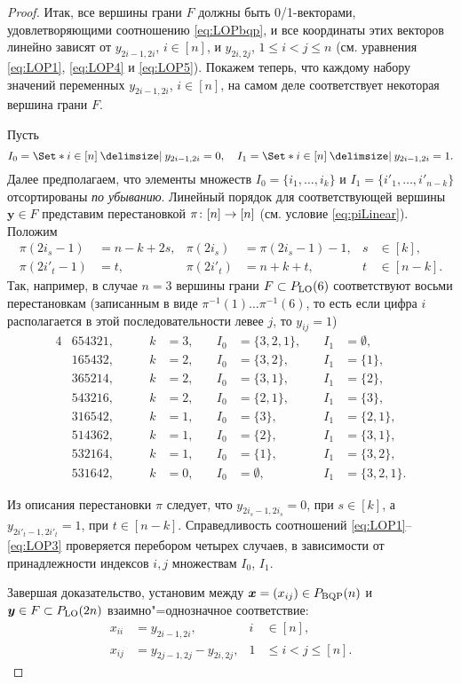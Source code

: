 \begin{proof}
Итак, все вершины грани $F$ должны быть 0/1-векторами, удовлетворяющими соотношению \eqref{eq:LOPbqp}, и все координаты этих векторов линейно зависят от $y_{2i-1, 2i}$, $i\in[n]$, и $y_{2i, 2j}$, $1 \le i < j \le n$ (см. уравнения \eqref{eq:LOP1}, \eqref{eq:LOP4} и \eqref{eq:LOP5}).
Покажем теперь, что каждому набору значений переменных $y_{2i-1, 2i}$, $i\in[n]$,
на самом деле соответствует некоторая вершина грани $F$.

Пусть 
\[
I_0 = \Set*{i \in [n] \given y_{2i-1, 2i} = 0}, \quad I_1 = \Set*{i \in [n] \given y_{2i-1, 2i} = 1}.
\]
Далее предполагаем, что элементы множеств $I_0 = \{i_1, \dots, i_k\}$ и $I_1 = \{i'_1, \dots, i'_{n-k}\}$ отсортированы \emph{по убыванию}.
Линейный порядок для соответствующей вершины $\bm{y} \in F$ представим перестановкой $\pi \colon [n] \to [n]$ (см. условие \eqref{eq:piLinear}).
Положим
\begin{align*}
\pi(2i_s-1) &= n-k + 2 s, &
\pi(2i_s) &= \pi(2i_s-1)-1, & s &\in [k],\\
\pi(2i'_t-1) &= t, &
\pi(2i'_t) &= n + k + t, & t &\in [n-k].
\end{align*}
Так, например, в случае $n=3$ вершины грани $F \subset P_{\textup{LO}}(6)$ соответствуют восьми перестановкам (записанным в виде $\pi^{-1}(1)\ldots\pi^{-1}(6)$, то есть если цифра $i$ располагается в этой последовательности левее $j$, то $y_{ij} = 1$)
\begin{alignat*}{4}
&654321, \qquad & k &=3 , \quad & I_0 &= \{3,2,1\}, \quad& I_1 &= \emptyset,\\
&165432, & k &=2 , \quad & I_0 &= \{3,2\},   & I_1 &= \{1\},\\
&365214, & k &=2 , \quad & I_0 &= \{3,1\},   & I_1 &= \{2\},\\
&543216, & k &=2 , \quad & I_0 &= \{2,1\},   & I_1 &= \{3\},\\
&316542, & k &=1 , \quad & I_0 &= \{3\},     & I_1 &= \{2,1\},\\
&514362, & k &=1 , \quad & I_0 &= \{2\},     & I_1 &= \{3,1\},\\
&532164, & k &=1 , \quad & I_0 &= \{1\},     & I_1 &= \{3,2\},\\
&531642, & k &=0 , \quad & I_0 &= \emptyset, & I_1 &= \{3,2,1\}.
\end{alignat*}

Из описания перестановки $\pi$ следует, что 
$y_{2i_s - 1, 2i_s} = 0$,  при $s \in [k]$, а
$y_{2i'_t - 1, 2i'_t} = 1$, при $t \in [n-k]$.
Справедливость соотношений \eqref{eq:LOP1}--\eqref{eq:LOP3} проверяется перебором четырех случаев, в зависимости от принадлежности индексов $i,j$ множествам $I_0$, $I_1$.

Завершая доказательство, установим между $\bm{x} = (x_{ij}) \in P_{\textup{BQP}}(n)$ и $\bm{y} \in F \subset P_{\textup{LO}}(2n)$ взаимно"=однозначное соответствие:
\begin{align*}
x_{ii} &= y_{2i-1, 2i}, & i &\in [n],\\
x_{ij} &= y_{2j-1, 2j} - y_{2i, 2j}, & 1 &\le i < j \le [n].
\end{align*}
\end{proof}

